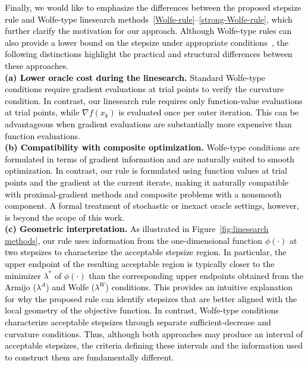 \documentclass[11pt, a4paper, oneside, reqno]{amsart}
\begin{document}
\textcolor{black}{Finally, we would like to emphasize the differences between the proposed stepsize rule and Wolfe-type linesearch methods~\eqref{Wolfe-rule}--\eqref{strong-Wolfe-rule}, which further clarify the motivation for our approach. Although Wolfe-type rules can also provide a lower bound on the stepsize under appropriate conditions~\cite[Section~3.1]{Nocedal2006}, the following distinctions highlight the practical and structural differences between these approaches.\\
\noindent\textbf{(a) Lower oracle cost during the linesearch.}
Standard Wolfe-type conditions require gradient evaluations at trial points to verify the curvature condition. In contrast, our linesearch rule requires only function-value evaluations at trial points, while $\nabla f(x_k)$ is evaluated once per outer iteration. This can be advantageous when gradient evaluations are substantially more expensive than function evaluations.\\
\noindent\textbf{(b) Compatibility with composite optimization.}
Wolfe-type conditions are formulated in terms of gradient information and are naturally suited to smooth optimization. In contrast, our rule is formulated using function values at trial points and the gradient at the current iterate, making it naturally compatible with proximal-gradient methods and composite problems with a nonsmooth component. A formal treatment of stochastic or inexact oracle settings, however, is beyond the scope of this work.\\
\noindent\textbf{(c) Geometric interpretation.}
As illustrated in Figure~\ref{fig:linesearch methods}, our rule uses information from the one-dimensional function $\phi(\cdot)$ at two stepsizes to characterize the acceptable stepsize region. In particular, the upper endpoint of the resulting acceptable region is typically closer to the minimizer $\lambda^*$ of $\phi(\cdot)$ than the corresponding upper endpoints obtained from the Armijo ($\lambda^A$) and Wolfe ($\lambda^W$) conditions. This provides an intuitive explanation for why the proposed rule can identify stepsizes that are better aligned with the local geometry of the objective function. In contrast, Wolfe-type conditions characterize acceptable stepsizes through separate sufficient-decrease and curvature conditions. Thus, although both approaches may produce an interval of acceptable stepsizes, the criteria defining these intervals and the information used to construct them are fundamentally different.}
\end{document}
